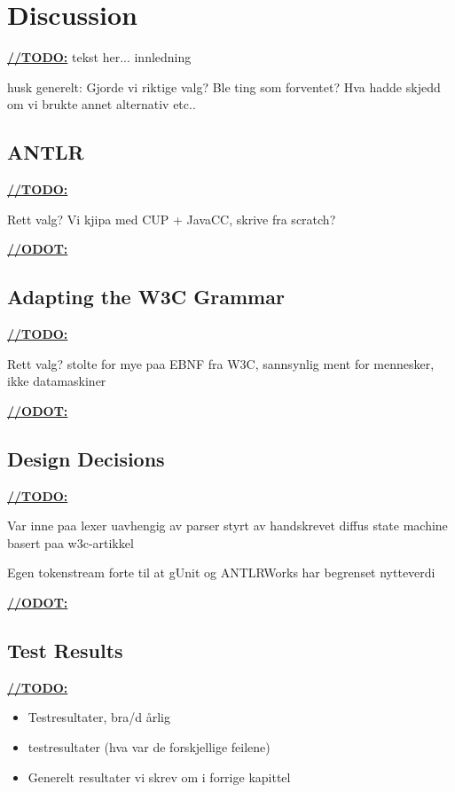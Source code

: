 \chapter{Discussion}
\underline{\textbf{\LARGE //TODO:}} tekst her... innledning


husk generelt: Gjorde vi riktige valg? Ble ting som forventet? Hva hadde skjedd om vi brukte annet alternativ etc..

\section{ANTLR}
\underline{\textbf{\LARGE //TODO:}}

Rett valg?
Vi kjipa med CUP + JavaCC, skrive fra scratch?

\underline{\textbf{\LARGE //ODOT:}}

\section{Adapting the W3C Grammar}
\underline{\textbf{\LARGE //TODO:}}

Rett valg?
stolte for mye paa EBNF fra W3C, sannsynlig ment for mennesker, ikke datamaskiner

\underline{\textbf{\LARGE //ODOT:}}

\section{Design Decisions}

\underline{\textbf{\LARGE //TODO:}}

Var inne paa lexer uavhengig av parser styrt av handskrevet diffus state machine basert paa w3c-artikkel

Egen tokenstream forte til at gUnit og ANTLRWorks har begrenset nytteverdi

\underline{\textbf{\LARGE //ODOT:}}


\section{Test Results}

\underline{\textbf{\LARGE //TODO:}}
\begin{itemize}
\item Testresultater, bra/d \aa rlig
\item testresultater (hva var de forskjellige feilene)
\item Generelt resultater vi skrev om i forrige kapittel
\end{itemize}

